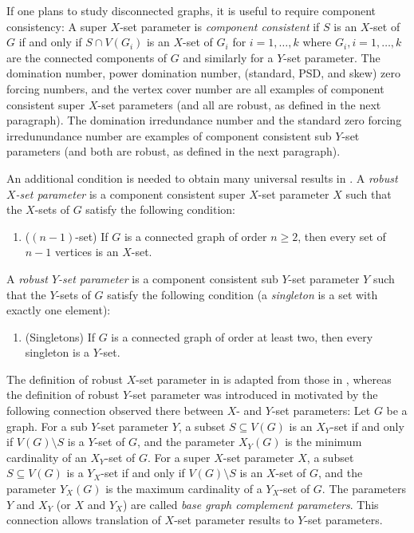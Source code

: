 \documentclass{article}
\numberwithin{figure}{section}
\numberwithin{table}{section}
\numberwithin{equation}{section}
\theoremstyle{definition}
\theoremstyle{definition}
\theoremstyle{definition}
\newcommand{\ben}{\begin{enumerate}}
\newcommand{\een}{\end{enumerate}}
\newcommand{\Xr}{X}
\begin{document}
If one plans to study disconnected graphs, it is useful to require component consistency: A super $X$-set  parameter is \emph{component consistent} if $S$ is an $X$-set  of $G$ if and only if $S\cap V(G_i)$ is an $X$-set of $G_i$ for $i=1,\dots,k$ where   $G_i,i=1,\dots,k$ are the connected components of $G$  and similarly for a $Y$-set parameter.  
The domination number, power domination number,  (standard, PSD, and skew) zero forcing numbers, and the vertex cover number are all examples of component consistent super $X$-set parameters (and all are robust, as defined in the next paragraph). The domination irredundance number and the  standard zero forcing irredunundance number are examples of component consistent  sub $Y$-set parameters (and both are robust, as defined in the next paragraph).  


An additional condition is needed to obtain many universal results in \cite{PDrecon, XTARiso,XTAR-YTAR}. A \emph{robust  $\Xr$-set parameter} is a component consistent  super $X$-set parameter $X$  such that   the $X$-sets of $G$ satisfy the following condition:  
\ben[]
\item ($(n-1)$-set)
If $G$ is a connected graph of order  $n\ge 2$, then every set of $n-1$ vertices is an $\Xr$-set.
\een 
A \emph{robust  $Y$-set parameter} is a component consistent  sub $Y$-set parameter $Y$  such that   the $Y$-sets of $G$ satisfy the following condition  (a \emph{singleton} is a set with exactly one element):  
\ben[]
\item 
(Singletons)
If $G$ is a connected graph of order  at least two,
then every singleton is a $Y$-set. 
\een  

The definition of robust $X$-set parameter in \cite{XTAR-YTAR} is adapted from those in \cite{PDrecon, XTARiso}, whereas the definition of robust $Y$-set parameter was introduced in \cite{XTAR-YTAR} motivated by the following connection observed there between $X$- and $Y$-set parameters:  Let $G$ be a graph.
For a  sub $Y$-set parameter $Y$, a subset $S\subseteq V(G)$ is an $X_Y$-set if and only if $V(G)\setminus S$ is a $Y$-set of $G$, and  the parameter $X_Y(G)$ is the minimum cardinality of an $X_Y$-set of $G$.
For a super $X$-set parameter $X$, a subset $S\subseteq V(G)$ is a $Y_X$-set if and only if $V(G)\setminus S$ is an $X$-set of $G$, and  the parameter $Y_X(G)$ is the maximum cardinality of  a $Y_X$-set of $G$.
The parameters $Y$ and $X_Y$ (or $X$ and $Y_X$) are called \emph{base graph complement  parameters}. 
This connection allows translation of $X$-set parameter results to $Y$-set parameters. 
\end{document}
